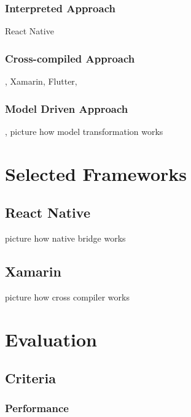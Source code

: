 \documentclass[Bachelor,BIF,english]{twbook}
\begin{document}
\subsection{Interpreted Approach}
React Native \cite[p.~3]{JohanssonSderberg2018}

\subsection{Cross-compiled Approach}
\cite{7479278}, \cite{7934674} Xamarin, Flutter,

\subsection{Model Driven Approach}
\cite{7479278}, \cite{7934674} picture how model transformation works

\chapter{Selected Frameworks}

\section{React Native}
\cite{Hansson_Vidhall_2016} \cite{Danielsson_2016} \cite[p.~21-32]{ZubaBernhard2017EdPb} picture how native bridge works

\section{Xamarin}
\cite[p.~14-20]{ZubaBernhard2017EdPb} picture how cross compiler works


\chapter{Evaluation}
\cite[p.~24]{Danielsson_2016}

\section{Criteria}

\subsection{Performance}
\cite[p.~25-26]{Danielsson_2016} \cite[p.~30]{Axelsson2016} \cite[p.~29-31]{Hansson_Vidhall_2016}
\end{document}
